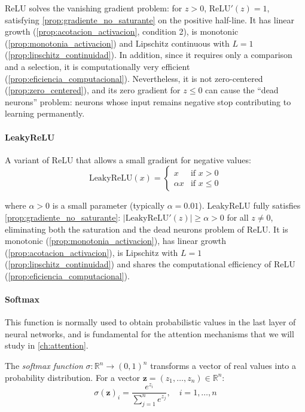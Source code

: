 \gls{ReLU} solves the vanishing gradient problem: for $z > 0$, $\text{ReLU}'(z) = 1$, satisfying \autoref{prop:gradiente_no_saturante} on the positive half-line. It has linear growth (\autoref{prop:acotacion_activacion}, condition 2), is monotonic (\autoref{prop:monotonia_activacion}) and Lipschitz continuous with $L = 1$ (\autoref{prop:lipschitz_continuidad}). In addition, since it requires only a comparison and a selection, it is computationally very efficient (\autoref{prop:eficiencia_computacional}). Nevertheless, it is not zero-centered (\autoref{prop:zero_centered}), and its zero gradient for $z \leq 0$ can cause the ``dead neurons'' problem: neurons whose input remains negative stop contributing to learning permanently.

\paragraph{LeakyReLU}

A variant of \gls{ReLU} that allows a small gradient for negative values:
\[
\text{LeakyReLU}(x) = \begin{cases}
x & \text{if } x > 0 \\
\alpha x & \text{if } x \leq 0
\end{cases}
\]

where $\alpha > 0$ is a small parameter (typically $\alpha = 0.01$). LeakyReLU fully satisfies \autoref{prop:gradiente_no_saturante}: $|\text{LeakyReLU}'(z)| \geq \alpha > 0$ for all $z \neq 0$, eliminating both the saturation and the dead neurons problem of ReLU. It is monotonic (\autoref{prop:monotonia_activacion}), has linear growth (\autoref{prop:acotacion_activacion}), is Lipschitz with $L = 1$ (\autoref{prop:lipschitz_continuidad}) and shares the computational efficiency of ReLU (\autoref{prop:eficiencia_computacional}).

\paragraph{Softmax}

This function is normally used to obtain probabilistic values in the last layer of neural networks, and is fundamental for the attention mechanisms that we will study in \autoref{ch:attention}.

\begin{definition}\label{def:softmax}
The \textit{softmax function} $\sigma: \mathbb{R}^n \to (0,1)^n$ transforms a vector of real values into a probability distribution. For a vector $\mathbf{z} = (z_1, \ldots, z_n) \in \mathbb{R}^n$:
\begin{equation}\label{eq:softmax}
\sigma(\mathbf{z})_i = \frac{e^{z_i}}{\sum_{j=1}^{n} e^{z_j}}, \quad i = 1, \ldots, n
\end{equation}
\end{definition}

